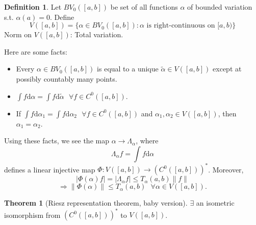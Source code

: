 \documentclass{article}
\newcommand{\sfa}{\text{  } \forall}
\theoremstyle{definition}
\newtheorem{thm}{Theorem}
\newtheorem{dfn}{Definition}
\begin{document}
\begin{dfn}
	Let $BV_0([a, b])$ be set of all functions $\alpha$ of bounded variation s.t. $\alpha(a) = 0$.
	Define 
	\[
		V([a, b]) = \{\alpha \in BV_0([a, b]): \alpha \text{ is right-continuous on }[a, b) \}
	\]
	Norm on $V([a, b])$: Total variation.

\end{dfn}

Here are some facts:
\begin{itemize}
	\item Every $\alpha \in BV_0([a, b])$ is equal to a unique $\tilde{\alpha} \in V([a, b])$ except at possibly countably many points.
		
	\item $\int f \mathrm{d} \alpha = \int f \mathrm{d} \tilde{\alpha} \sfa f \in C^0([a, b])$.

	\item If $\int f \mathrm{d} \alpha_1 = \int f \mathrm{d} \alpha_2 \sfa f \in C^0([a, b])$ and $\alpha_1, \alpha_2 \in V([a, b])$, then $\alpha_1 = \alpha_2$.
\end{itemize}

Using these facts, we see the map $\alpha \to \Lambda_\alpha$, where
\[
	\Lambda_\alpha f = \int f \mathrm{d} \alpha
\]
defines a linear injective map $\Phi:V([a, b]) \to (C^0([a, b]))^*$.
Moreover, 
\[
	|\Phi(\alpha) f| = |\Lambda_\alpha f| \leq T_\alpha(a, b) \|f\|
\]
\[
	\Rightarrow \|\Phi(\alpha)\| \leq T_\alpha(a, b) \sfa \alpha \in V([a, b]).
\]
\begin{thm}[Riesz representation theorem, baby version]
	$\exists$ an isometric isomorphism from $(C^0([a, b]))^*$ to $V([a, b])$.
\end{thm}
\end{document}
